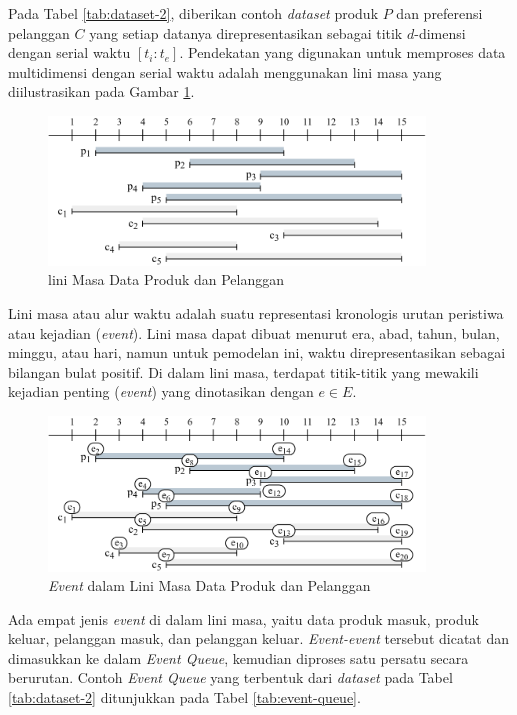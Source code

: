 Pada Tabel \ref{tab:dataset-2}, diberikan contoh \textit{dataset} produk $P$ dan preferensi pelanggan $C$ yang setiap datanya direpresentasikan sebagai titik $d$-dimensi dengan serial waktu $[t_i:t_e]$. Pendekatan yang digunakan untuk memproses data multidimensi dengan serial waktu adalah menggunakan lini masa yang diilustrasikan pada Gambar \ref{fig:timeline}.
\begin{figure}[H]
	\centering
	\includegraphics[width=10cm]{assets/img/bab3/timeline-polos.png}
	\caption{lini Masa Data Produk dan Pelanggan}
	\label{fig:timeline}
\end{figure}

Lini masa atau alur waktu adalah suatu representasi kronologis urutan peristiwa atau kejadian (\textit{event}). Lini masa dapat dibuat menurut era, abad, tahun, bulan, minggu, atau hari, namun untuk pemodelan ini, waktu direpresentasikan sebagai bilangan bulat positif. Di dalam lini masa, terdapat titik-titik yang mewakili kejadian penting (\textit{event}) yang dinotasikan dengan $e \in E$. 
\begin{figure}[H]
	\centering
	\includegraphics[width=10cm]{assets/img/bab3/timeline-event.png}
	\caption{\textit{Event} dalam Lini Masa Data Produk dan Pelanggan}
	\label{fig:timeline-event}
\end{figure}

Ada empat jenis \textit{event} di dalam lini masa, yaitu data produk masuk, produk keluar, pelanggan masuk, dan pelanggan keluar. \textit{Event-event} tersebut dicatat dan dimasukkan ke dalam \textit{Event Queue}, kemudian diproses satu persatu secara berurutan. Contoh \textit{Event Queue} yang terbentuk dari \textit{dataset} pada Tabel \ref{tab:dataset-2} ditunjukkan pada Tabel \ref{tab:event-queue}.

